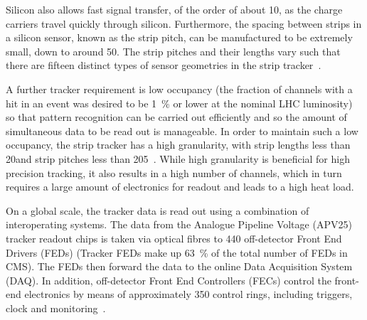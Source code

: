 Silicon also allows fast signal transfer, of the order of about 10\ns, as the charge carriers travel quickly
through silicon. Furthermore, the spacing between strips in a silicon sensor, known as the strip pitch, can be
manufactured to be extremely small, down to around 50\um. The strip pitches and their lengths vary such that
there are fifteen distinct types of sensor geometries in the strip
tracker~\cite{Commissioning_and_Performance_Strip_Tracker}.

A further tracker requirement is low occupancy (the fraction of channels with a hit in an event was desired to
be 1~\% or lower at the nominal LHC luminosity) so that pattern recognition can be carried out efficiently and
so the amount of simultaneous data to be read out is manageable. In order to maintain such a low occupancy,
the strip tracker has a high granularity, with strip lengths less than 20\cm and strip pitches less than
205\um~\cite{Palmonari:1260970}. While high granularity is beneficial for high precision tracking, it also
results in a high number of channels, which in turn requires a large amount of electronics for readout and
leads to a high heat load.

On a global scale, the tracker data is read out using a combination of interoperating systems.
The data from the Analogue Pipeline Voltage (APV25) tracker readout chips is taken via optical fibres to 440
off-detector Front End Drivers (FEDs) (Tracker FEDs make up 63~\% of the total number of FEDs in CMS).
The FEDs then forward the data to the online Data Acquisition System (DAQ). In addition, off-detector Front
End Controllers (FECs) control the front-end electronics by means of approximately 350 control rings,
including triggers, clock and monitoring~\cite{CMS_experiment, Corrin}.


